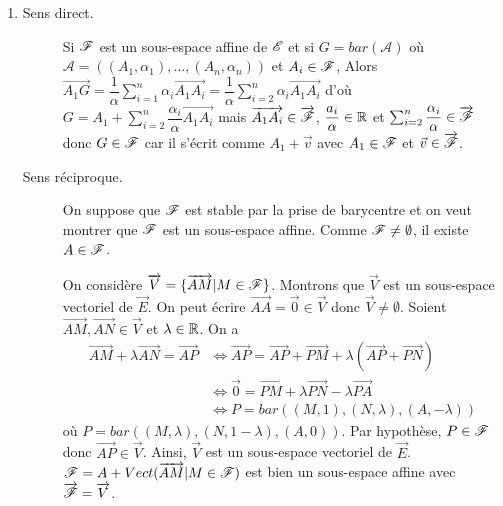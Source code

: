\documentclass[a4paper,12pt]{article}
\begin{document}
\begin{demonstration}
    \begin{enumerate}
        \item 
        \begin{description}
            \item[Sens direct.] 
            Si $\mathscr{F}$ est un sous-espace affine de $\mathscr{E}$ et si $G = bar(\mathcal{A})$ où $\mathcal{A} = ((A_1, \alpha_1), \ldots, (A_n, \alpha_n))$ et $A_i \in \mathscr{F}$,
            Alors $\overrightarrow{A_1 G} = \dfrac{1}{\alpha} \sum_{i=1}^n \alpha_i \overrightarrow{A_1 A_i} = \dfrac{1}{\alpha} \sum_{i=2}^n \alpha_i \overrightarrow{A_1 A_i}$
            d'où $G = A_1 + \sum_{i=2}^n \dfrac{\alpha_i}{\alpha} \overrightarrow{A_1 A_i}$ mais $\overrightarrow{A_1 A_i} \in \overrightarrow{\mathscr{F}}$, $\dfrac{a_i}{\alpha} \in \mathbb{R}$
            et $\sum_{i=2}^n \dfrac{\alpha_i}{\alpha} \in \overrightarrow{\mathscr{F}}$ donc $G \in \mathscr{F}$ car il s'écrit comme $A_1 + \vec{v}$ avec $A_1 \in \mathscr{F}$ et $\vec{v} \in \overrightarrow{\mathscr{F}}$.
            \item[Sens réciproque.]
            On suppose que $\mathscr{F}$ est stable par la prise de barycentre et on veut montrer que $\mathscr{F}$ est un sous-espace affine.
            Comme $\mathscr{F} \neq \emptyset$, il existe $A \in \mathscr{F}$.

            On considère $\overrightarrow{V} = \{ \overrightarrow{AM} | M \in \mathscr{F} \}$. Montrons que $\overrightarrow{V}$ est un sous-espace vectoriel de $\overrightarrow{E}$.
            On peut écrire $\overrightarrow{AA} = \overrightarrow{0} \in \overrightarrow{V}$ donc $\overrightarrow{V} \neq \emptyset$.
            Soient $\overrightarrow{AM}, \overrightarrow{AN} \in \overrightarrow{V}$ et $\lambda\in \mathbb{R}$.
            On a 
            \begin{align*}
                \overrightarrow{AM} + \lambda \overrightarrow{AN} = \overrightarrow{AP} &\iff \overrightarrow{AP} = \overrightarrow{AP} + \overrightarrow{PM} + \lambda (\overrightarrow{AP} + \overrightarrow{PN}) \\
                &\iff \vec{0} = \overrightarrow{PM} + \lambda \overrightarrow{PN} - \lambda \overrightarrow{PA} \\
                &\iff P = bar((M, 1), (N, \lambda), (A, -\lambda))
            \end{align*}
            où $P = bar((M, \lambda), (N, 1 - \lambda), (A, 0))$.
            Par hypothèse, $P \in \mathscr{F}$ donc $\overrightarrow{AP} \in \overrightarrow{V}$.
            Ainsi, $\overrightarrow{V}$ est un sous-espace vectoriel de $\overrightarrow{E}$.
            $\mathscr{F} = A + Vect(\overrightarrow{AM} | M \in \mathscr{F})$ est bien un sous-espace affine avec $\overrightarrow{\mathscr{F}} = \overrightarrow{V}$.
        \end{description}
    \end{enumerate}
\end{demonstration}
\end{document}
